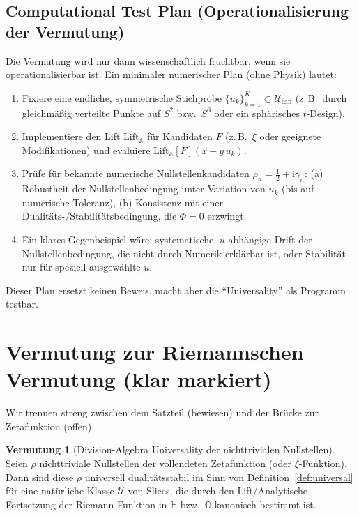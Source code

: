 \documentclass[11pt,a4paper]{article}
\theoremstyle{plain}
\theoremstyle{definition}
\newtheorem{conjecture}{Vermutung}
\theoremstyle{remark}
\newcommand{\Hh}{\mathbb{H}}
\newcommand{\Okt}{\mathbb{O}}
\newcommand{\ii}{\mathrm{i}}
\begin{document}
\subsection*{Computational Test Plan (Operationalisierung der Vermutung)}
Die Vermutung wird nur dann wissenschaftlich fruchtbar, wenn sie operationalisierbar ist.
Ein minimaler numerischer Plan (ohne Physik) lautet:
\begin{enumerate}
\item Fixiere eine endliche, symmetrische Stichprobe $\{u_k\}_{k=1}^K\subset\mathcal U_{\mathrm{can}}$
      (z.\,B.\ durch gleichmäßig verteilte Punkte auf $S^2$ bzw.\ $S^6$ oder ein sphärisches $t$-Design).
\item Implementiere den Lift $\mathrm{Lift}_{\mathbb A}$ für Kandidaten $F$ (z.\,B.\ $\xi$ oder geeignete Modifikationen)
      und evaluiere $\mathrm{Lift}_{\mathbb A}[F](x+y\,u_k)$.
\item Prüfe für bekannte numerische Nullstellenkandidaten $\rho_n=\tfrac12+\ii\gamma_n$:
      (a) Robustheit der Nullstellenbedingung unter Variation von $u_k$ (bis auf numerische Toleranz),
      (b) Konsistenz mit einer Dualitäts-/Stabilitätsbedingung, die $\Phi=0$ erzwingt.
\item Ein klares Gegenbeispiel wäre: systematische, $u$-abhängige Drift der Nullstellenbedingung, die nicht durch
      Numerik erklärbar ist, oder Stabilität nur für speziell ausgewählte $u$.
\end{enumerate}
Dieser Plan ersetzt keinen Beweis, macht aber die ``Universality'' als Programm testbar.


\section{Vermutung zur Riemannschen Vermutung (klar markiert)}\label{sec:conj}
Wir trennen streng zwischen dem Satzteil (bewiesen) und der Br\"ucke zur Zetafunktion (offen).

\begin{conjecture}[Division-Algebra Universality der nichttrivialen Nullstellen]\label{conj:rh}
Seien $\rho$ nichttriviale Nullstellen der vollendeten Zetafunktion (oder $\xi$-Funktion).
Dann sind diese $\rho$ universell dualit\"atsstabil im Sinn von
Definition~\ref{def:universal} f\"ur eine nat\"urliche Klasse $\mathcal{U}$ von Slices, die durch den
Lift/Analytische Fortsetzung der Riemann-Funktion in $\Hh$ bzw.\ $\Okt$ kanonisch bestimmt ist.
\end{conjecture}
\end{document}
